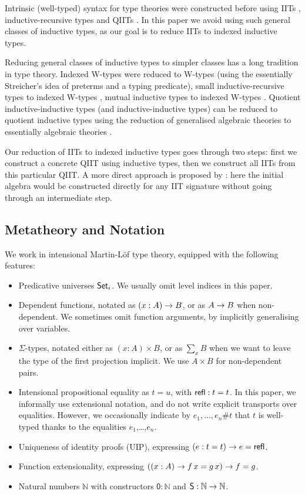 \documentclass[a4paper,UKenglish,cleveref, autoref]{lipics-v2019}
\begin{document}
Intrinsic (well-typed) syntax for type theories were constructed
before using IITs \cite{chapman09eatitself}, inductive-recursive types
\cite{nisse,Altenkirch:2014:CO:2631172.2631176} and QIITs
\cite{ttintt}. In this paper we avoid using such general classes of
inductive types, as our goal is to reduce IITs to indexed inductive
types.

Reducing general classes of inductive types to simpler classes has a
long tradition in type theory. Indexed W-types were reduced to W-types
\cite{indexedcont} (using the essentially Streicher's idea of preterms
and a typing predicate), small inductive-recursive types to indexed
W-types \cite{malatasta13smallir}, mutual inductive types to indexed
W-types \cite{mutual}. Quotient inductive-inductive types (and
inductive-inductive types) can be reduced to quotient inductive types
using the reduction of generalised algebraic theories to essentially
algebraic theories \cite{gat}.

Our reduction of IITs to indexed inductive types goes through two
steps: first we construct a concrete QIIT using inductive types, then
we construct all IITs from this particular QIIT. A more direct
approach is proposed by \cite{erasure}: here the initial algebra would
be constructed directly for any IIT signature without going through an
intermediate step.

\subsection{Metatheory and Notation}

We work in intensional Martin-Löf type theory, equipped with the following features:
\begin{itemize}
  \item Predicative universes $\mathsf{Set}_i$. We usually omit level indices in this paper.
  \item Dependent functions, notated as $(x : A)\rightarrow B$, or as $A \rightarrow B$ when
    non-dependent. We sometimes omit function arguments, by implicitly
    generalising over variables.
  \item $\Sigma$-types, notated either as $(x : A)\times B$, or as $\sum\limits_{x} B$
        when we want to leave the type of the first projection implicit. We use $A
        \times B$ for non-dependent pairs.
  \item Intensional propositional equality as $t = u$, with $\mathsf{refl} : t = t$. In
    this paper, we informally use extensional notation, and do not write
    explicit transports over equalities. However, we occasionally indicate by
    $e_1,\dots,e_n \#t$ that $t$ is well-typed thanks to the equalities
    $e_1$,\dots,$e_n$.
  \item Uniqueness of identity proofs (UIP), expressing $(e : t = t)\rightarrow e = \mathsf{refl}$.
  \item Function extensionality, expressing $((x : A) \rightarrow f\,x = g\,x) \rightarrow f = g$.
  \item Natural numbers $\mathbb{N}$ with constructors $\mathsf{0}:\mathbb{N}$ and $\mathsf{S}:\mathbb{N}\rightarrow\mathbb{N}$.

\end{itemize}
\end{document}
